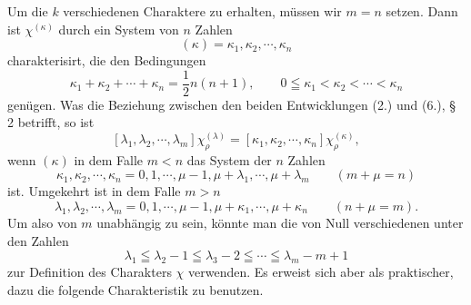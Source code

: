 \documentclass[11pt]{article}
\begin{document}
Um die $k$ verschiedenen Charaktere zu erhalten, müssen wir $m=n$ setzen. Dann ist $\chi^{(\kappa)}$ durch ein System von $n$ Zahlen
\begin{equation}\tag{1.}
 (\kappa)=\kappa_1,
\kappa_2,
\cdots,
\kappa_n
\end{equation}
charakterisirt, die den Bedingungen
\begin{equation}\tag{2.}
 \kappa_1+
\kappa_2+\cdots+
\kappa_n=\frac12n(n+1),\qquad 0\leqq\kappa_1<\kappa_2<\cdots<\kappa_n
\end{equation}
genügen. Was die Beziehung zwischen den beiden Entwicklungen (2.) und (6.), § 2 betrifft, so ist
\[
 [\lambda_1,
\lambda_2,
\cdots,
\lambda_m]\chi_\rho^{(\lambda)}=[\kappa_1,
\kappa_2,
\cdots,
\kappa_n]\chi_\rho^{(\kappa)},
\]
wenn $(\kappa)$ in dem Falle $m<n$ das System der $n$ Zahlen
\begin{equation}\tag{3.}
 \kappa_1,
\kappa_2,
\cdots,
\kappa_n=0,1,
\cdots,
\mu-1,
\mu+
\lambda_1,
\cdots,
\mu+
\lambda_m\qquad(m+
\mu=n)
\end{equation}
ist. Umgekehrt ist in dem Falle $m>n$
\begin{equation}\tag{4.}
 \lambda_1,
\lambda_2,
\cdots,
\lambda_m=0,1,
\cdots,
\mu-1,
\mu+
\kappa_1,
\cdots,
\mu+
\kappa_n\qquad(n+
\mu=m).
\end{equation}
Um also von $m$ unabhängig zu sein, könnte man die von Null verschiedenen unter den Zahlen
\[
 \lambda_1\leqq\lambda_2-1\leqq\lambda_3-2\leqq\cdots\leqq\lambda_m-m+1
\]
zur Definition des Charakters $\chi$ verwenden. Es erweist sich aber als praktischer, dazu die folgende Charakteristik zu benutzen.
\end{document}
